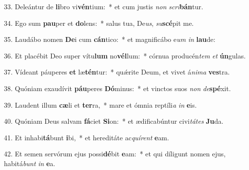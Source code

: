 33. Deleántur de \textbf{li}bro vi\textbf{vén}tium:~*  et cum justis \textit{non} \textit{scri}\textbf{bán}tur.\

34. Ego sum \textbf{pau}per et \textbf{do}lens:~*  salus tua, De\textit{us}, \textit{su}\textbf{scé}pit me.\

35. Laudábo nomen \textbf{De}i cum \textbf{cán}tico:~*  et magnificábo e\textit{um} \textit{in} \textbf{lau}de:\

36. Et placébit Deo super vítu\textbf{lum} no\textbf{vél}lum:~*  córnua producén\textit{tem} \textit{et} \textbf{ún}gulas.\

37. Vídeant páuperes \textbf{et} læ\textbf{tén}tur:~*  quǽrite Deum, et vivet á\textit{ni}\textit{ma} \textbf{ves}tra.\

38. Quóniam exaudívit \textbf{páu}peres \textbf{Dó}minus:~*  et vinctos suos \textit{non} \textit{de}\textbf{spé}xit.\

39. Laudent illum \textbf{cæ}li et \textbf{ter}ra,~*  mare et ómnia reptíli\textit{a} \textit{in} \textbf{e}is.\

40. Quóniam Deus salvam \textbf{fá}ciet \textbf{Si}on:~*  et ædificabúntur civi\textit{tá}\textit{tes} \textbf{Ju}da.\

41. Et inhabi\textbf{tá}bunt \textbf{i}bi,~*  et hereditáte ac\textit{quí}\textit{rent} \textbf{e}am.\

42. Et semen servórum ejus possi\textbf{dé}bit \textbf{e}am:~*  et qui díligunt nomen ejus, habitá\textit{bunt} \textit{in} \textbf{e}a.\

